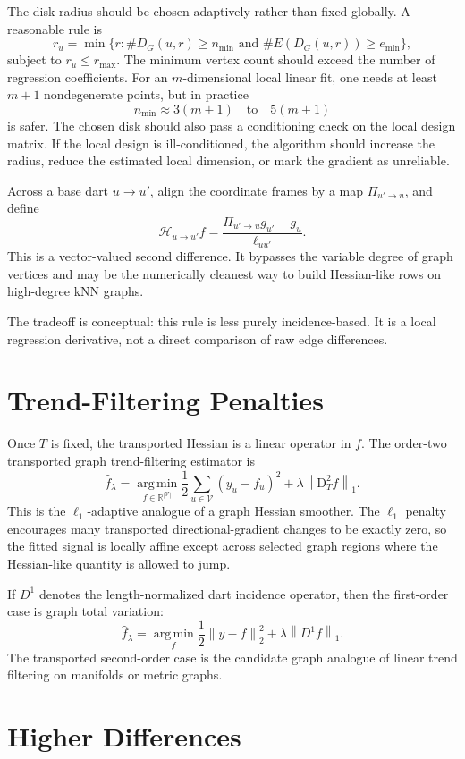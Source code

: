 \documentclass[11pt]{article}
\newcommand{\R}{\mathbb R}
\newcommand{\V}{\mathcal V}
\newcommand{\D}{\mathrm D}
\newcommand{\Hess}{\mathcal H}
\newcommand{\norm}[1]{\left\lVert #1 \right\rVert}
\newcommand{\argmin}{\operatorname*{arg\,min}}
\begin{document}
The disk radius should be chosen adaptively rather than fixed globally.  A
reasonable rule is
\[
  r_u
  =
  \min\{r:\#D_G(u,r)\ge n_{\min}
  \text{ and } \#E(D_G(u,r))\ge e_{\min}\},
\]
subject to \(r_u\le r_{\max}\).  The minimum vertex count should exceed the
number of regression coefficients.  For an \(m\)-dimensional local linear fit,
one needs at least \(m+1\) nondegenerate points, but in practice
\[
  n_{\min}\approx 3(m+1)\quad\text{to}\quad 5(m+1)
\]
is safer.  The chosen disk should also pass a conditioning check on the local
design matrix.  If the local design is ill-conditioned, the algorithm should
increase the radius, reduce the estimated local dimension, or mark the gradient
as unreliable.

Across a base dart \(u\to u'\), align the coordinate frames by a map
\(\Pi_{u'\to u}\), and define
\[
  \Hess_{u\to u'}f
  =
  \frac{\Pi_{u'\to u} g_{u'}-g_u}{\ell_{uu'}}.
\]
This is a vector-valued second difference.  It bypasses the variable degree of
graph vertices and may be the numerically cleanest way to build Hessian-like
rows on high-degree kNN graphs.

The tradeoff is conceptual: this rule is less purely incidence-based.  It is a
local regression derivative, not a direct comparison of raw edge differences.

\section{Trend-Filtering Penalties}

Once \(T\) is fixed, the transported Hessian is a linear operator in \(f\).
The order-two transported graph trend-filtering estimator is
\[
  \widehat f_\lambda
  =
  \argmin_{f\in\R^{|\V|}}
  \frac12\sum_{u\in\V}(y_u-f_u)^2
  +
  \lambda\norm{\D_T^2 f}_1.
\]
This is the \(\ell_1\)-adaptive analogue of a graph Hessian smoother.  The
\(\ell_1\) penalty encourages many transported directional-gradient changes to
be exactly zero, so the fitted signal is locally affine except across selected
graph regions where the Hessian-like quantity is allowed to jump.

If \(D^1\) denotes the length-normalized dart incidence operator, then the
first-order case is graph total variation:
\[
  \widehat f_\lambda
  =
  \argmin_f
  \frac12\norm{y-f}_2^2+\lambda\norm{D^1f}_1.
\]
The transported second-order case is the candidate graph analogue of linear
trend filtering on manifolds or metric graphs.

\section{Higher Differences}
\end{document}
